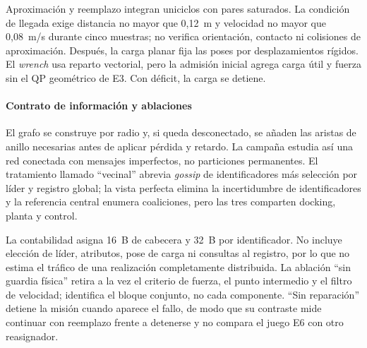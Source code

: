 Aproximación y reemplazo integran uniciclos con pares saturados. La condición de llegada exige distancia no mayor que 0,12~m y velocidad no mayor que 0,08~m/s durante cinco muestras; no verifica orientación, contacto ni colisiones de aproximación. Después, la carga planar fija las poses por desplazamientos rígidos. El \emph{wrench} usa reparto vectorial, pero la admisión inicial agrega carga útil y fuerza sin el QP geométrico de E3. Con déficit, la carga se detiene.

\paragraph{Contrato de información y ablaciones}

El grafo se construye por radio y, si queda desconectado, se añaden las aristas de anillo necesarias antes de aplicar pérdida y retardo. La campaña estudia así una red conectada con mensajes imperfectos, no particiones permanentes. El tratamiento llamado ``vecinal'' abrevia \emph{gossip} de identificadores más selección por líder y registro global; la vista perfecta elimina la incertidumbre de identificadores y la referencia central enumera coaliciones, pero las tres comparten docking, planta y control.

La contabilidad asigna 16~B de cabecera y 32~B por identificador. No incluye elección de líder, atributos, pose de carga ni consultas al registro, por lo que no estima el tráfico de una realización completamente distribuida. La ablación ``sin guardia física'' retira a la vez el criterio de fuerza, el punto intermedio y el filtro de velocidad; identifica el bloque conjunto, no cada componente. ``Sin reparación'' detiene la misión cuando aparece el fallo, de modo que su contraste mide continuar con reemplazo frente a detenerse y no compara el juego E6 con otro reasignador.


